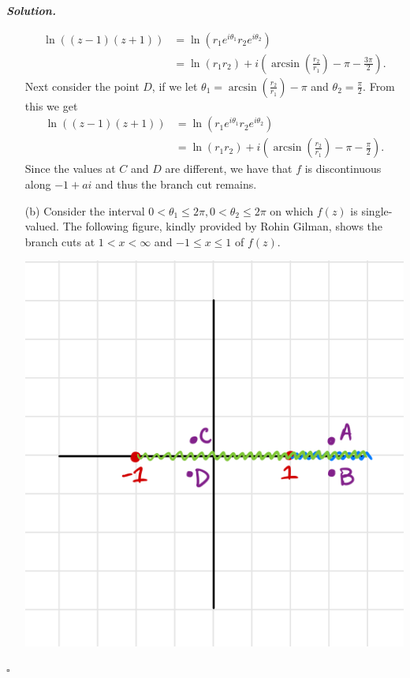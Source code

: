 \documentclass[12pt]{report}
\newenvironment{solution}[1][\it{Solution}]{\textbf{#1. } }{$\square$}
\newcommand{\paren}[1]{{\left(#1\right)}} %
\begin{document}
\begin{solution}
\begin{enumerate}
        \begin{align*}
            \ln((z-1)(z+1)) &= \ln(r_1e^{i\theta_1}r_2e^{i\theta_2})\\
            &=\ln(r_1r_2) + i\paren{\arcsin\paren{\frac{r_2}{r_1}} - \pi - \frac{3\pi}{2}}.
        \end{align*}
        Next consider the point $D$, if we let $\theta_1 = \arcsin\paren{\frac{r_2}{r_1}} - \pi$ and $\theta_2 = \frac{\pi}{2}$. From this we get
        \begin{align*}
            \ln((z-1)(z+1)) &= \ln(r_1e^{i\theta_1}r_2e^{i\theta_2})\\
            &=\ln(r_1r_2) + i\paren{\arcsin\paren{\frac{r_2}{r_1}} - \pi - \frac{\pi}{2}}.
        \end{align*}
        Since the values at $C$ and $D$ are different, we have that $f$ is discontinuous along $-1+ai$ and thus the branch cut remains.

        \item [(b)]
        Consider the interval $0 < \theta_1 \leq 2 \pi, 0 < \theta_2 \leq 2 \pi$ on which $f(z)$ is single-valued. The following figure, kindly provided by Rohin Gilman, shows the branch cuts at $1 < x < \infty$ and $-1 \leq x \leq 1$ of $f(z)$. 


        \begin{center}
            \includegraphics[width=.5\textwidth]{figures/3b.png}
        \end{center}
        

\end{enumerate}
\end{solution}
\end{document}
